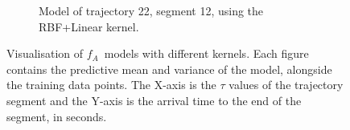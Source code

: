 \begin{figure}
\begin{subfigure}[b]{0.475\textwidth}
            \caption[]%
            {{\small Model of trajectory 22, segment 12, using the RBF+Linear kernel.}}    
            \label{fig:22-12-rbf-linear}
        \end{subfigure}
        \caption[ Visualisation of $f_A$ models with different kernels ]
        {{\small Visualisation of $f_A$ models with different kernels.
        Each figure contains the predictive mean and variance of the model, alongside the training data points.  
        The X-axis is the $\tau$ values of the trajectory segment and the Y-axis is the arrival time to the end of the segment, in seconds.}} 
        \label{fig:10-22-models}
    \end{figure}


\newpage
